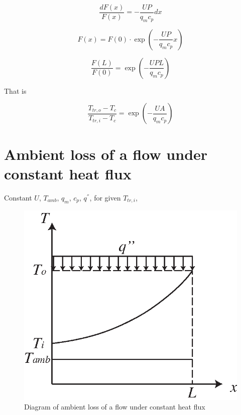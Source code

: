 \documentclass{article}
\begin{document}
\begin{equation*}
	\dfrac{dF(x)}{F(x)}=-\dfrac{UP}{q_{m}c_{p}}dx
\end{equation*}


\begin{equation*}
	F(x)=F(0)\cdot\exp(-\dfrac{UP}{q_{m}c_{p}}x)
\end{equation*}


\begin{equation*}
	\dfrac{F(L)}{F(0)}=\exp(-\dfrac{UPL}{q_{m}c_{p}})
\end{equation*}


That is

\begin{equation*}
	\frac{T_{tr,o}-T_{c}}{T_{tr,i}-T_{c}}=\exp(-\frac{UA}{q_{m}c_{p}})
\end{equation*}
\clearpage{}

\section{\noindent \label{sec:CTCHTHT}Ambient loss of a flow under constant
heat flux}

Constant $U$, $T_{amb}$, $q_{m}$, $c_{p}$, $q^{''}$, for given
$T_{tr,i}$,

\noindent \begin{center}
\begin{figure}[h]
	\noindent \centering{}\includegraphics[width=0.8\columnwidth]{graphics/CTCHFHX}
	\protect\caption{\label{fig:CTCHFHX}Diagram of ambient loss of a flow under constant
heat flux}
\end{figure}

\par\end{center}
\end{document}
